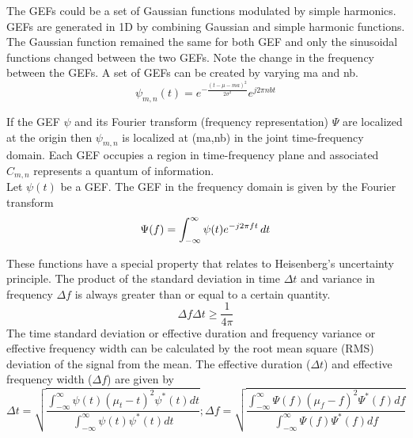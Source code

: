 The GEFs could be a set of Gaussian functions modulated by simple harmonics. GEFs are generated in 1D by combining Gaussian and simple harmonic functions. The Gaussian function remained the same for both GEF and only the sinusoidal functions changed between the two GEFs. Note the change in the frequency between the GEFs. A set of GEFs can be created by varying ma and nb.\\
\begin{equation*}
\psi_{m,n}(t) =  e^{-\frac{(t-\mu-ma)^2}{2\sigma^2}} e^{j2\pi nbt}
\end{equation*}

If the GEF $\psi$ and its Fourier transform (frequency representation) $\Psi$ are localized at the origin then $\psi_{m,n}$ is localized at (ma,nb) in the joint time-frequency domain. Each GEF occupies a region in time-frequency plane and associated $C_{m,n}$ represents a quantum of information.\\

Let $\psi(t)$ be a GEF. The GEF in the frequency domain is given by the Fourier transform \\
\begin{equation*}
\Psi(f) = \int_{-\infty}^{\infty}\psi(t) e^{-j2\pi ft}\, dt \\
\end{equation*}

These functions have a special property that relates to Heisenberg's uncertainty principle. The product of the standard deviation in time $\Delta t$ and variance in frequency $\Delta f$ is always greater than or equal to a certain quantity.
\begin{equation}
\Delta f \Delta t \geq \frac{1}{4\pi}
\end{equation}
The time standard deviation or effective duration and frequency variance or effective frequency width can be calculated by the root mean square (RMS) deviation of the signal from the mean. The effective duration ($\Delta t$) and effective frequency width ($\Delta f$) are given by
\begin{equation*}
\Delta t = \sqrt{\frac{\int_{-\infty}^{\infty}{\psi(t)(\mu_t - t)^2\psi ^*(t)dt}}{\int_{-\infty}^{\infty}{\psi(t)\psi ^*(t)dt}}} ;
\Delta f = \sqrt{\frac{\int_{-\infty}^{\infty}{\Psi(f)(\mu_f - f)^2\Psi ^*(f)df}}{\int_{-\infty}^{\infty}{\Psi(f)\Psi ^*(f)df}}}
\end{equation*}

